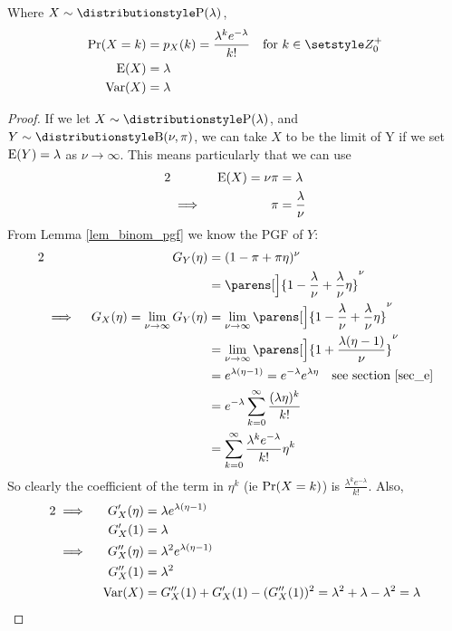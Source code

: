\begin{theorem}
 Where \(X \sim \Poisson(\lambda)\),
 \begin{align*}
  \Prob(X = k) &= p_X(k) = \frac{\lambda^k e^{-\lambda}}{k!}
      \quad \text{for \(k \in \Integers^+_0\)} \\
  \Expect(X) &= \lambda \\
  \Var(X) &= \lambda
 \end{align*}
\end{theorem}
\begin{proof}
 If we let \(X \sim \Poisson(\lambda)\), and \(Y \sim \Binomial(\nu, \pi)\),
 we can take \(X\) to be the limit of Y if we set \(\operatorname{E}(Y) = \lambda\)
 as \(\nu \to \infty\). This means particularly that we can use
 \begin{alignat*}2
  && \Expect(X) = \nu \pi &= \lambda \\
  &\implies{}& \pi &= \frac \lambda \nu
 \end{alignat*}
 From Lemma \ref{lem_binom_pgf} we know the PGF of \(Y\):
 \begin{alignat*}2
  && G_Y(\eta) &= (1 - \pi + \pi \eta)^\nu \\
  &&  &= \parens[\Big]{1 - \frac \lambda \nu + \frac \lambda \nu \eta}^\nu \\
  &\implies{}& G_X(\eta) = \lim_{\nu \to \infty}G_Y(\eta)
      &= \lim_{\nu \to \infty} \parens[\Big]{1 - \frac \lambda \nu
                                  + \frac \lambda \nu \eta}^\nu \\
  &&  &= \lim_{\nu \to \infty} \parens[\Big]
      {1 + \frac{\lambda(\eta - 1)}\nu}^\nu \\
  &&  &= e^{\lambda(\eta - 1)} = e^{-\lambda}e^{\lambda \eta}
      \quad \text{see section \ref{sec_e}} \\
  &&  &= e^{-\lambda} \sum_{k = 0}^\infty \frac{(\lambda \eta)^k}{k!} \\
  &&  &= \sum_{k = 0}^\infty \frac{\lambda ^k e^{-\lambda}}{k!} \eta^k \\
 \end{alignat*}
  So clearly the coefficient of the term in \(\eta^k\) (ie \(\operatorname{Pr}(X = k)\))
  is \(\frac{\lambda^k e^{-\lambda}}{k!}\). Also,
  \begin{alignat*}2
  &\implies{}& G_X'(\eta) &= \lambda e^{\lambda(\eta - 1)} \\
  && G_X'(1) &= \lambda \\
  &\implies{}& G_X''(\eta) &= \lambda^2 e^{\lambda(\eta - 1)} \\
  && G_X''(1) &= \lambda^2 \\
  && \Var(X) &= G_X''(1) + G_X'(1) - (G_X''(1))^2
      = \lambda^2 + \lambda - \lambda^2 = \lambda \qedhere
 \end{alignat*}
\end{proof}

